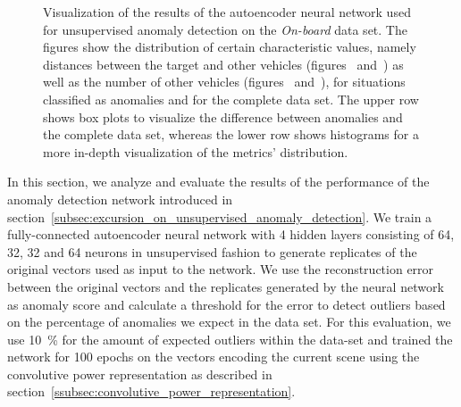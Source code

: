 \begin{figure}[t]
{    }
    \caption{Visualization of the results of the autoencoder neural network used for unsupervised anomaly detection on the \emph{On-board} data set.
        The figures show the distribution of certain characteristic values, namely distances between the target and other vehicles (figures~\protect{} and~\protect{}) as well as the number of other vehicles (figures~\protect{} and~\protect{}), for situations classified as anomalies and for the complete data set.
        The upper row shows box plots to visualize the difference between anomalies and the complete data set, whereas the lower row shows histograms for a more in-depth visualization of the metrics' distribution.
}
    \label{fig:anomaly_on_board}
\end{figure}

In this section, we analyze and evaluate the results of the performance of the anomaly detection network introduced in section~\ref{subsec:excursion_on_unsupervised_anomaly_detection}.
We train a fully-connected autoencoder neural network with \num{4} hidden layers consisting of \num{64}, \num{32}, \num{32} and \num{64} neurons in unsupervised fashion to generate replicates of the original vectors used as input to the network.
We use the reconstruction error between the original vectors and the replicates generated by the neural network as anomaly score and calculate a threshold for the error to detect outliers based on the percentage of anomalies we expect in the data set.
For this evaluation, we use \SI{10}{\percent} for the amount of expected outliers within the data-set and trained the network for \num{100} epochs on the vectors encoding the current scene using the convolutive power representation as described in section~\ref{ssubsec:convolutive_power_representation}.

